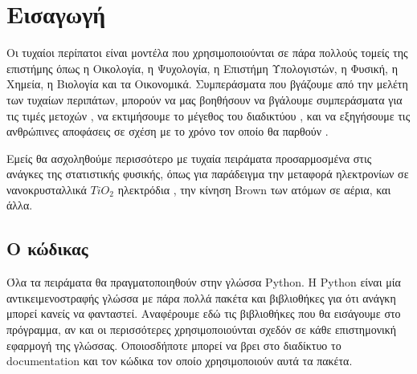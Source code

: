 \chapter{Εισαγωγή}
Οι τυχαίοι περίπατοι είναι μοντέλα που χρησιμοποιούνται σε πάρα πολλούς τομείς της επιστήμης όπως η Οικολογία, η Ψυχολογία, η Επιστήμη Υπολογιστών, η Φυσική, η Χημεία, η Βιολογία και τα Οικονομικά. Συμπεράσματα που βγάζουμε από την μελέτη των τυχαίων περιπάτων, μπορούν να μας βοηθήσουν να βγάλουμε συμπεράσματα για τις τιμές μετοχών \citep{kodde1984forecasting}, να εκτιμήσουμε το μέγεθος του διαδικτύου \citep{bar2008random}, και να εξηγήσουμε τις ανθρώπινες αποφάσεις σε σχέση με το χρόνο τον οποίο θα παρθούν \citep{nosofsky2008exemplar}. 
\par
Εμείς θα ασχοληθούμε περισσότερο με τυχαία πειράματα προσαρμοσμένα στις ανάγκες της στατιστικής φυσικής, όπως για παράδειγμα την μεταφορά ηλεκτρονίων σε νανοκρυσταλλικά $TiO_2$ ηλεκτρόδια \citep{nelson1999continuous}, την κίνηση {\en Brown} των ατόμων σε αέρια, και άλλα.

\section{Ο κώδικας}
Όλα τα πειράματα θα πραγματοποιηθούν στην γλώσσα {\en Python}. Η {\en Python} είναι μία αντικειμενοστραφής γλώσσα με πάρα πολλά πακέτα και βιβλιοθήκες για ότι ανάγκη μπορεί κανείς να φανταστεί. Αναφέρουμε εδώ τις βιβλιοθήκες που θα εισάγουμε στο πρόγραμμα, αν και οι περισσότερες χρησιμοποιούνται σχεδόν σε κάθε επιστημονική εφαρμογή της γλώσσας. Οποιοσδήποτε μπορεί να βρει στο διαδίκτυο το {\en documentation} και τον κώδικα τον οποίο χρησιμοποιούν αυτά τα πακέτα. 

